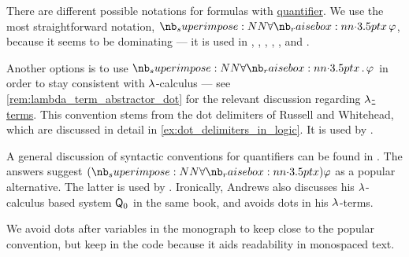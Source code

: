 \begin{remark}\label{rem:notation_for_quantifiers}
  There are different possible notations for formulas with \hyperref[def:predicate_logic_alphabet/quantifiers]{quantifier}. We use the most straightforward notation, \( \qforall x \varphi \), because it seems to be dominating --- it is used in
  \cite[ch. 2]{Hinman2005Logic},
  \cite[ch. II]{Kleene2002Logic},
  \cite[ch. IV]{Smullyan1995FOL},
  \cite[\S I.9]{КолмогоровДрагалин2006Логика},
  \cite[def. 2.1.6]{Герасимов2011Вычислимость},
  \cite[ch. 3]{ШеньВерещагин2017ЯзыкиИИсчисления} and
  \cite[ch. II]{Эдельман1975Логика}.

  Another options is to use \( \quantifier* \synforall x \varphi \) in order to stay consistent with \( {\mathrm \lambda} \)-calculus --- see \cref{rem:lambda_term_abstractor_dot} for the relevant discussion regarding \hyperref[def:lambda_term]{\( {\mathrm \lambda} \)-terms}. This convention stems from the dot delimiters of Russell and Whitehead, which are discussed in detail in \cref{ex:dot_delimiters_in_logic}. It is used by .

  A general discussion of syntactic conventions for quantifiers can be found in \cite{MathSE:standards_for_quantifier_notation}. The answers suggest \( (\synforall x) \varphi \) as a popular alternative. The latter is used by . Ironically, Andrews also discusses his \( {\mathrm \lambda} \)-calculus based system \hyperref[rem:simply_typed_hol]{\( \textsf{Q}_0 \)} in the same book, and avoids dots in his \( {\mathrm \lambda} \)-terms.

  We avoid dots after variables in the monograph to keep close to the popular convention, but keep in the code because it aids readability in monospaced text.
\end{remark}

